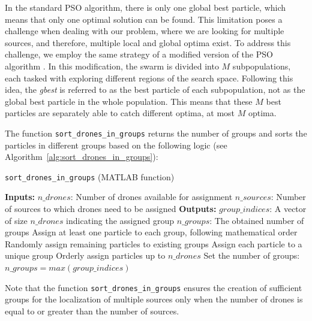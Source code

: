 \par In the standard PSO algorithm, there is only one global best particle, 
which means that only one optimal solution can be found. This limitation 
poses a challenge when dealing with our problem, where we are looking for multiple sources, 
and therefore, multiple local and global optima exist. To address this challenge, 
we employ the same strategy of a modified version of the PSO algorithm \cite{PSO_IMPORTANT}. 
In this modification, the swarm is divided into $M$ subpopulations, each tasked with exploring 
different regions of the search space. Following this idea, the \textit{gbest} is referred to as 
the best particle of each subpopulation, not as the global best particle in the whole population. 
This means that these $M$ best particles are separately able to catch different optima, at most $M$ optima.

\par The function \texttt{sort\_drones\_in\_groups} returns the number of groups and sorts the 
particles in different groups based on the following logic (see Algorithm~\ref{alg:sort_drones_in_groups}):
\begin{algorithm}[H]
    \caption{\texttt{sort\_drones\_in\_groups} (MATLAB function)}\label{alg:sort_drones_in_groups}
    \begin{algorithmic}[1]
    \State \textbf{Inputs:}
    \State $n\_drones$: Number of drones available for assignment
    \State $n\_sources$: Number of sources to which drones need to be assigned
    \State \textbf{Outputs:}
    \State $group\_indices$: A vector of size $n\_drones$ indicating the assigned group
    \State $n\_groups$: The obtained number of groups
        \State Assign at least one particle to each group, following mathematical order
        \State Randomly assign remaining particles to existing groups
        \State Assign each particle to a unique group
    \Else
        \State Orderly assign particles up to $n\_drones$
    \EndIf
    \State Set the number of groups: $n\_groups = max(group\_indices)$
    \end{algorithmic}
\end{algorithm}

\par Note that the function \texttt{sort\_drones\_in\_groups} ensures the creation of sufficient groups 
for the localization of multiple sources only when the number of drones is equal to or greater than 
the number of sources.

